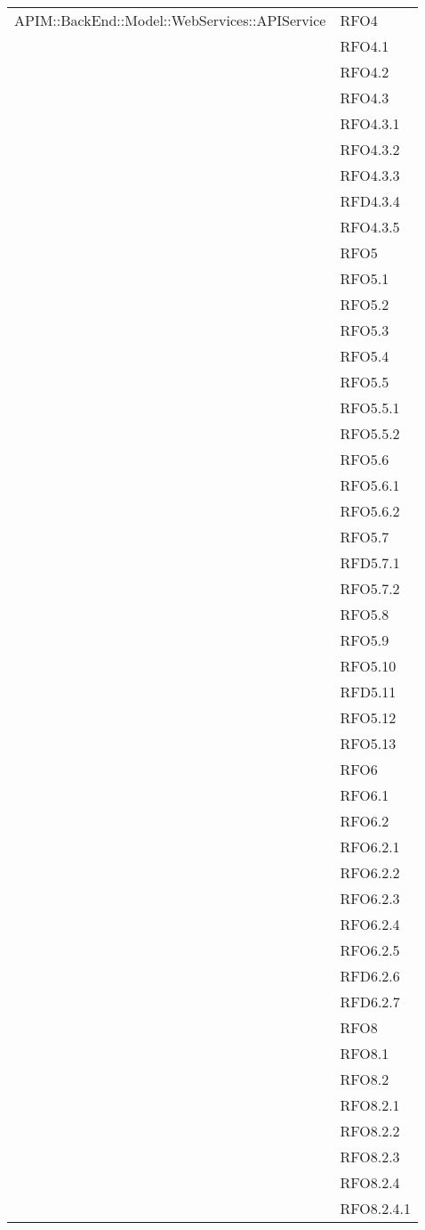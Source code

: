\begin{longtable}{ p{12cm} | p{4cm} }
		    \hline
		    APIM::BackEnd::Model::WebServices::APIService
		    & RFO4 \\
		    & RFO4.1 \\
		    & RFO4.2 \\
		    & RFO4.3 \\
		    & RFO4.3.1 \\
		    & RFO4.3.2 \\
		    & RFO4.3.3 \\
		    & RFD4.3.4 \\
		    & RFO4.3.5 \\
		    & RFO5 \\
& RFO5.1 \\
& RFO5.2 \\
& RFO5.3 \\
& RFO5.4 \\
& RFO5.5 \\
& RFO5.5.1 \\
& RFO5.5.2 \\
& RFO5.6\\
& RFO5.6.1 \\
& RFO5.6.2 \\
& RFO5.7 \\
& RFD5.7.1 \\
& RFO5.7.2 \\
& RFO5.8 \\
& RFO5.9 \\
& RFO5.10 \\
& RFD5.11 \\
& RFO5.12 \\
& RFO5.13 \\
& RFO6 \\
& RFO6.1 \\
& RFO6.2 \\
& RFO6.2.1 \\
& RFO6.2.2 \\
& RFO6.2.3 \\
& RFO6.2.4 \\
& RFO6.2.5 \\
& RFD6.2.6 \\
& RFD6.2.7 \\
& RFO8 \\
& RFO8.1 \\
& RFO8.2 \\
& RFO8.2.1 \\
& RFO8.2.2 \\
& RFO8.2.3 \\
& RFO8.2.4 \\
& RFO8.2.4.1 \\

\end{longtable}
